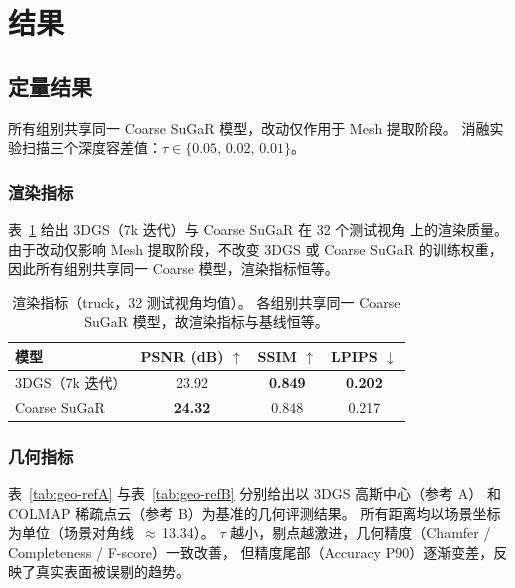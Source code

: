 \section{结果}

\subsection{定量结果}
\label{ssec:baseline-results}

所有组别共享同一 Coarse SuGaR 模型，改动仅作用于 Mesh 提取阶段。
消融实验扫描三个深度容差值：$\tau \in \{0.05,\, 0.02,\, 0.01\}$。

\subsubsection{渲染指标}
\label{ssec:baseline-render}

表~\ref{tab:render-metrics} 给出 3DGS（7k 迭代）与 Coarse SuGaR 在 32 个测试视角
上的渲染质量。由于改动仅影响 Mesh 提取阶段，不改变 3DGS 或 Coarse SuGaR
的训练权重，因此所有组别共享同一 Coarse 模型，渲染指标恒等。

\begin{table}[H]
\centering
\caption{渲染指标（truck，32 测试视角均值）。
各组别共享同一 Coarse SuGaR 模型，故渲染指标与基线恒等。}
\label{tab:render-metrics}
\begin{tabular}{lccc}
\toprule
\textbf{模型} & \textbf{PSNR (dB) $\uparrow$}
               & \textbf{SSIM $\uparrow$}
               & \textbf{LPIPS $\downarrow$} \\
\midrule
3DGS（7k 迭代）   & 23.92 & \textbf{0.849} & \textbf{0.202} \\
Coarse SuGaR       & \textbf{24.32} & 0.848 & 0.217 \\
\bottomrule
\end{tabular}
\end{table}

\subsubsection{几何指标}
\label{ssec:baseline-geo}

表~\ref{tab:geo-refA} 与表~\ref{tab:geo-refB} 分别给出以 3DGS 高斯中心（参考 A）
和 COLMAP 稀疏点云（参考 B）为基准的几何评测结果。
所有距离均以场景坐标为单位（场景对角线~$\approx$\,13.34）。
$\tau$ 越小，剔点越激进，几何精度（Chamfer / Completeness / F-score）一致改善，
但精度尾部（Accuracy P90）逐渐变差，反映了真实表面被误剔的趋势。

